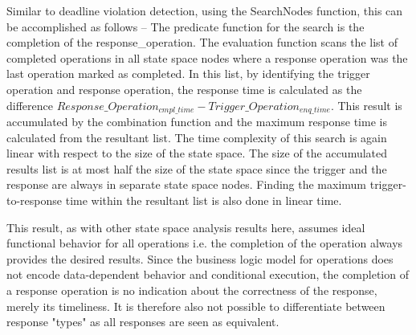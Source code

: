 Similar to deadline violation detection, using the SearchNodes function, this can be accomplished as follows -- The predicate function for the search is the completion of the response\_operation. The evaluation function scans the list of completed operations in all state space nodes where a response operation was the last operation marked as completed. In this list, by identifying the trigger operation and response operation, the response time is calculated as the difference $Response\_Operation_{cmpl\_time} - Trigger\_Operation_{enq\_time}$. This result is accumulated by the combination function and the maximum response time is calculated from the resultant list. The time complexity of this search is again linear with respect to the size of the state space. The size of the accumulated results list is at most half the size of the state space since the trigger and the response are always in separate state space nodes. Finding the maximum trigger-to-response time within the resultant list is also done in linear time.   

This result, as with other state space analysis results here, assumes ideal functional behavior for all operations i.e. the completion of the operation always provides the desired results. Since the business logic model for operations does not encode data-dependent behavior and conditional execution, the completion of a response operation is no indication about the correctness of the response, merely its timeliness. It is therefore also not possible to differentiate between response "types" as all responses are seen as equivalent. 



